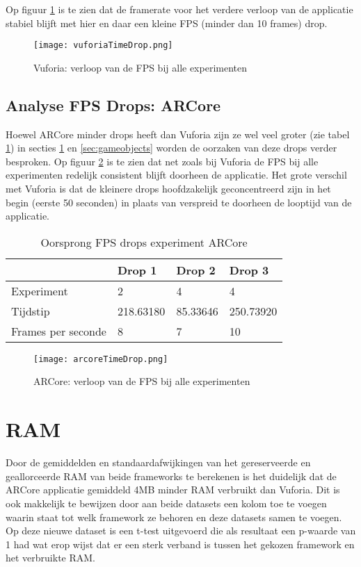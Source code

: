 Op figuur \ref{fig:vuforiaTimeDrop} is te zien dat de framerate voor het verdere verloop van de applicatie stabiel blijft met hier en daar een kleine FPS (minder dan 10 frames) drop.

\begin{figure}
    \texttt{[image: vuforiaTimeDrop.png]}
    \caption{Vuforia: verloop van de FPS bij alle experimenten}
    \label{fig:vuforiaTimeDrop}
\end{figure}

\subsection{Analyse FPS Drops: ARCore}
Hoewel ARCore minder drops heeft dan Vuforia zijn ze wel veel groter (zie tabel \ref{tbl:arcoredrop}) in secties \ref{sec:memory} en \ref{sec:gameobjects} worden de oorzaken van deze drops verder besproken. Op figuur \ref{fig:arcoreTimeDrop} is te zien dat net zoals bij Vuforia de FPS bij alle experimenten redelijk consistent blijft doorheen de applicatie. Het grote verschil met Vuforia is dat de kleinere drops hoofdzakelijk geconcentreerd zijn in het begin (eerste 50 seconden) in plaats van verspreid te doorheen de looptijd van de applicatie. 

\begin{table}[]
    \begin{tabular}{@{}l|l|l|l@{}}
        & Drop 1    & Drop 2   & Drop 3    \\ \midrule
        Experiment         & 2         & 4        & 4         \\
        Tijdstip           & 218.63180 & 85.33646 & 250.73920 \\
        Frames per seconde & 8         & 7        & 10       
    \end{tabular}
    \caption{Oorsprong FPS drops experiment ARCore}\label{tbl:arcoredrop}
\end{table}

\begin{figure}
    \texttt{[image: arcoreTimeDrop.png]}
    \caption{ARCore: verloop van de FPS bij alle experimenten}
    \label{fig:arcoreTimeDrop}
\end{figure}

\section{RAM}\label{sec:memory}
Door de gemiddelden en standaardafwijkingen van het gereserveerde en geallorceerde RAM van beide frameworks te berekenen is het duidelijk dat de ARCore applicatie gemiddeld 4MB minder RAM verbruikt dan Vuforia. Dit is ook makkelijk te bewijzen door aan beide datasets een kolom toe te voegen waarin staat tot welk framework ze behoren en deze datasets samen te voegen. Op deze nieuwe dataset is een t-test uitgevoerd die als resultaat een p-waarde van 1 had wat erop wijst dat er een sterk verband is tussen het gekozen framework en het verbruikte RAM.

